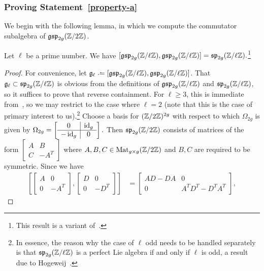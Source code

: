 \subsubsection{Proving Statement~\ref{property-a}}\label{honeyseek}

We begin with the following lemma, in which we compute the commutator subalgebra of $\mathfrak{gsp}_{2g}(\mathbb Z / 2 \mathbb Z)$.

\begin{lemma} \label{lemma:gsp-perfect} 
	Let $\ell$ be a prime number. We have
	\(
		[\mathfrak{gsp}_{2g}({\mathbb Z} / \ell {\mathbb Z}), \mathfrak{gsp}_{2g}({\mathbb Z} / \ell {\mathbb Z})] = \mathfrak{sp}_{2g}({\mathbb Z} / \ell {\mathbb Z}).
	\)\footnote{This result is a variant of~\cite[Proposition 2.10]{landesman-swaminathan-tao-xu:rational-families}.}
\end{lemma} 

\begin{proof} 
For convenience, let $\mf{g}_\ell \defeq [\mf{gsp}_{2g}(\bz / \ell \bz), \mf{gsp}_{2g}(\bz / \ell \bz)]$. That $\mathfrak{g}_\ell \subset \mathfrak{sp}_{2g}(\mathbb Z/\ell\mathbb Z)$ is obvious from the definitions of $\mathfrak{gsp}_{2g}(\mathbb Z/\ell\mathbb Z)$ and $\mathfrak{sp}_{2g}(\mathbb Z/\ell\mathbb Z)$, so it suffices to prove that reverse containment. For $\ell \geq 3$, this is immediate from~\cite[Proposition 2.10]{landesman-swaminathan-tao-xu:rational-families}, so we may restrict to the case where $\ell = 2$ (note that this is the case of primary interest to us).\footnote{In essence, the reason why the case of $\ell$ odd needs to be handled separately is that $\mathfrak{sp}_{2g}(\mathbb Z/\ell\mathbb Z)$ is a perfect Lie algebra if and only if $\ell$ is odd, a result due to Hogeweij~\cite{hog1982}.} Choose a basis for $(\mathbb Z/2\mathbb Z)^{2g}$ with respect to which $\Omega_{2g}$ is given by
    \(
    	\Omega_{2g} = \left[ \begin{array}{c|c} 0 & \operatorname{id}_g \\  \hline  -\operatorname{id}_g & 0 \end{array} \right].
    \)
    Then $\mathfrak{sp}_{2g}({\mathbb Z} / 2 {\mathbb Z})$ consists of matrices of the form
    \(
   	\left[ \begin{array}{c|c} A & B \\ \hline  C & -A^T \end{array} \right]
    \)
   where $A,B,C \in \operatorname{Mat}_{g \times g}(\mathbb Z/2\mathbb Z)$ and $B,C$ are required to be symmetric. Since we have
\begin{align}
	\label{equation:block-diagonal-commutator}
 \left[ \left[\begin{array}{c|c} A & 0 \\ \hline 0 & -A^T \end{array}\right], \left[\begin{array}{c|c} D & 0 \\ \hline 0 & -D^T \end{array}\right] \right] & = \left[\begin{array}{c|c} AD - DA & 0 \\ \hline 0 & A^TD^T - D^TA^T \end{array}\right],

\end{align}
\end{proof}
